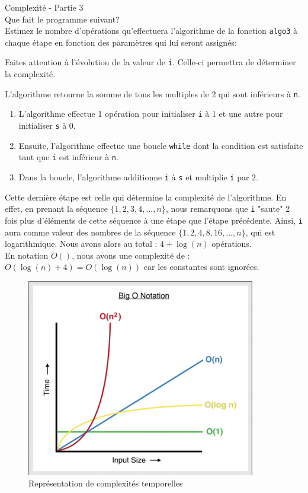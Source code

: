 \begin{Exercice}[5 minutes] Complexité - Partie 3\\
    Que fait le programme suivant? \\
    Estimez le nombre d'opérations qu'effectuera l'algorithme de la fonction \lstinline{algo3} à chaque étape en fonction des paramètres qui lui seront assignés:
    
\begin{conseil}
   Faites attention à l'évolution de la valeur de \lstinline{i}. Celle-ci permettra de déterminer la complexité.
\end{conseil}
    
\begin{solution}
    L'algorithme retourne la somme de tous les multiples de 2 qui sont inférieurs à \lstinline{n}.
    \begin{enumerate}
        \item L'algorithme effectue 1 opération pour initialiser \lstinline{i} à 1 et une autre pour
        initialiser \lstinline{s} à 0. 
        \item Ensuite, l'algorithme effectue une boucle \lstinline{while} dont la condition est satisfaite
        tant que \lstinline{i} est inférieur à \lstinline{n}. 
        \item Dans la boucle, l'algorithme additionne \lstinline{i} à \lstinline{s} et multiplie \lstinline{i} par 2. 
    \end{enumerate}
    Cette dernière étape est celle qui détermine la complexité de l'algorithme. En effet, en prenant la séquence $\{1, 2, 3, 4, ..., n\}$, nous remarquons
    que \lstinline{i} "saute" 2 fois plus d'éléments de cette séquence à une étape que l'étape précédente. Ainsi, \lstinline{i} aura comme valeur des nombres de la séquence
    $\{1, 2, 4, 8, 16, ..., n\}$, qui est logarithmique. Nous avons alors au total : $4 + \log(n)$ opérations. \\
    En notation $O()$, nous avons une complexité de : $O(\log(n) + 4) = O(\log(n))$ car les constantes sont ignorées. 
    
\end{solution}

\begin{figure}[h!]
    \centering
    \includegraphics[width=10cm]{resources/complexity.png}
    \caption{Représentation de complexités temporelles}
    \label{bigO}
\end{figure}


\end{Exercice}
